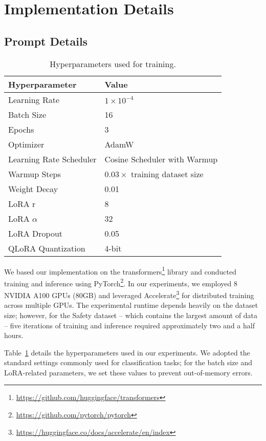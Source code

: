 \section{Implementation Details}
\subsection{Prompt Details}
\begin{table}[ht]
	\centering
	\small
	\begin{tabular}{ll}
	\toprule
	\textbf{Hyperparameter} & \textbf{Value} \\
	\midrule
	Learning Rate           & $1 \times 10^{-4}$ \\
	Batch Size              & 16 \\
	Epochs                  & 3 \\
	Optimizer               & AdamW \\
	Learning Rate Scheduler & Cosine Scheduler with Warmup \\
	Warmup Steps            & $0.03 \times$ training dataset size \\
	Weight Decay            & 0.01 \\
	LoRA r                  & 8 \\
	LoRA $\alpha$           & 32 \\
	LoRA Dropout            & 0.05 \\
	QLoRA Quantization      & 4-bit \\
	\bottomrule
	\end{tabular}
	\caption{Hyperparameters used for training.}
	\label{tab:hypara}
	\end{table}

We based our implementation on the transformers\footnote{\url{https://github.com/huggingface/transformers}} library and conducted training and inference using PyTorch\footnote{\url{https://github.com/pytorch/pytorch}}. In our experiments, we employed 8 NVIDIA A100 GPUs (80GB) and leveraged Accelerate\footnote{\url{https://huggingface.co/docs/accelerate/en/index}} for distributed training across multiple GPUs. The experimental runtime depends heavily on the dataset size; however, for the Safety dataset – which contains the largest amount of data – five iterations of training and inference required approximately two and a half hours.

Table~\ref{tab:hypara} details the hyperparameters used in our experiments. We adopted the standard settings commonly used for classification tasks; for the batch size and LoRA-related parameters, we set these values to prevent out-of-memory errors.


